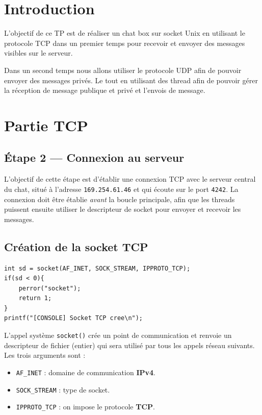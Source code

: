 \documentclass[a4paper,12pt,french]{article}
\begin{document}

\section{Introduction}

L'objectif de ce TP est de réaliser un chat box sur socket Unix en utilisant le protocole TCP dans un premier temps pour recevoir et envoyer des messages visibles sur le serveur.

Dans un second temps nous allons utiliser le protocole UDP afin de pouvoir envoyer des messages privés. Le tout en utilisant des thread afin de pouvoir gérer la réception de message publique et privé et l'envois de message.



\pagebreak
\section{Partie TCP}
\subsection{Étape 2 — Connexion au serveur}

L'objectif de cette étape est d'établir une connexion TCP avec le serveur central du chat, situé à l'adresse \texttt{169.254.61.46} et qui écoute sur le port \texttt{4242}. La connexion doit être établie \emph{avant} la boucle principale, afin que les threads puissent ensuite utiliser le descripteur de socket pour envoyer et recevoir les messages.

\subsection*{Création de la socket TCP}

\begin{verbatim}
int sd = socket(AF_INET, SOCK_STREAM, IPPROTO_TCP);
if(sd < 0){
    perror("socket");
    return 1;
}
printf("[CONSOLE] Socket TCP cree\n");
\end{verbatim}

L'appel système \texttt{socket()} crée un point de communication et renvoie un descripteur de fichier (entier) qui sera utilisé par tous les appels réseau suivants. Les trois arguments sont :
\begin{itemize}
    \item \texttt{AF\_INET} : domaine de communication \textbf{IPv4}.
    \item \texttt{SOCK\_STREAM} : type de socket.
    \item \texttt{IPPROTO\_TCP} : on impose le protocole \textbf{TCP}.
\end{itemize}
\end{document}
